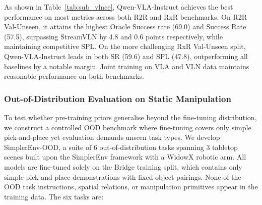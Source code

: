 \documentclass{llmxive}
\begin{document}
As shown in Table~\ref{tab:sub_vlnce}, Qwen-VLA-Instruct achieves the best performance on most metrics across both R2R and RxR benchmarks. On R2R Val-Unseen, it attains the highest Oracle Success rate (69.0) and Success Rate (57.5), surpassing StreamVLN by 4.8 and 0.6 points respectively, while maintaining competitive SPL. On the more challenging RxR Val-Unseen split, Qwen-VLA-Instruct leads in both SR (59.6) and SPL (47.8), outperforming all baselines by a notable margin. Joint training on VLA and VLN data maintains reasonable performance on both benchmarks.



\subsubsection{Out-of-Distribution Evaluation on Static Manipulation}
To test whether pre-training priors generalise beyond the fine-tuning
  distribution, we construct a controlled OOD benchmark where fine-tuning
  covers only simple pick-and-place yet evaluation demands unseen task types.
We develop SimplerEnv-OOD, a suite of 6 out-of-distribution tasks spanning 3 tabletop scenes built upon the SimplerEnv framework with a WidowX robotic arm. All models are fine-tuned solely on the Bridge training split, which contains only simple pick-and-place demonstrations with fixed object pairings. None of the OOD task instructions, spatial relations, or manipulation primitives appear in the training data. The six tasks are:
\end{document}
